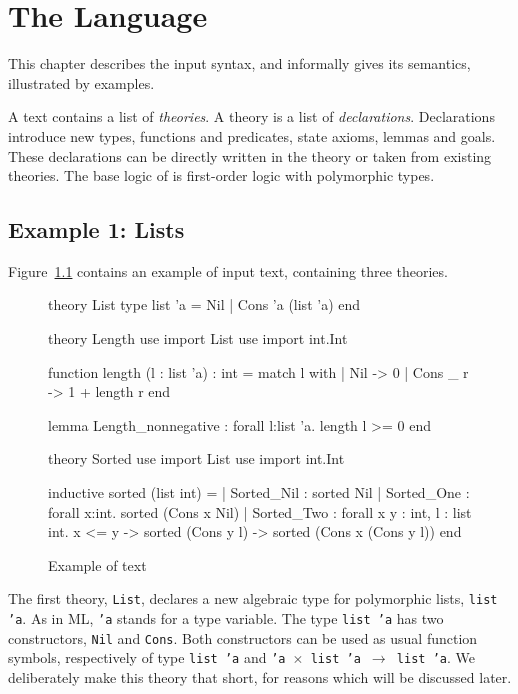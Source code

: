 \chapter{The \why Language}
\label{chap:syntax}

This chapter describes the input syntax, and informally gives its semantics,
illustrated by examples.

A \why text contains a list of \emph{theories}.
A theory is a list of \emph{declarations}. Declarations introduce new
types, functions and predicates, state axioms, lemmas and goals.
These declarations can be directly written in the theory or taken from
existing theories. The base logic of \why is first-order
logic with polymorphic types.

\section{Example 1: Lists}

Figure~\ref{fig:tutorial1} contains an example of \why input
text, containing three theories.

\begin{figure}
\centering
\begin{whycode}
theory List
  type list 'a = Nil | Cons 'a (list 'a)
end

theory Length
  use import List
  use import int.Int

  function length (l : list 'a) : int =
    match l with
    | Nil      -> 0
    | Cons _ r -> 1 + length r
    end

  lemma Length_nonnegative : forall l:list 'a. length l >= 0
end

theory Sorted
  use import List
  use import int.Int

  inductive sorted (list int) =
    | Sorted_Nil :
        sorted Nil
    | Sorted_One :
        forall x:int. sorted (Cons x Nil)
    | Sorted_Two :
        forall x y : int, l : list int.
        x <= y -> sorted (Cons y l) -> sorted (Cons x (Cons y l))
end
\end{whycode}
\vspace*{-1em}%
\caption{Example of \why text}
\label{fig:tutorial1}
\end{figure}

The first theory, \texttt{List},
declares a new algebraic type for polymorphic lists, \texttt{list 'a}.
As in ML, \texttt{'a} stands for a type variable.
The type \texttt{list 'a} has two constructors, \texttt{Nil} and
\texttt{Cons}. Both constructors can be used as usual function
symbols, respectively of type \texttt{list 'a} and \texttt{'a
  $\times$ list 'a $\rightarrow$ list 'a}.
We deliberately make this theory that short, for reasons which will be
discussed later.

